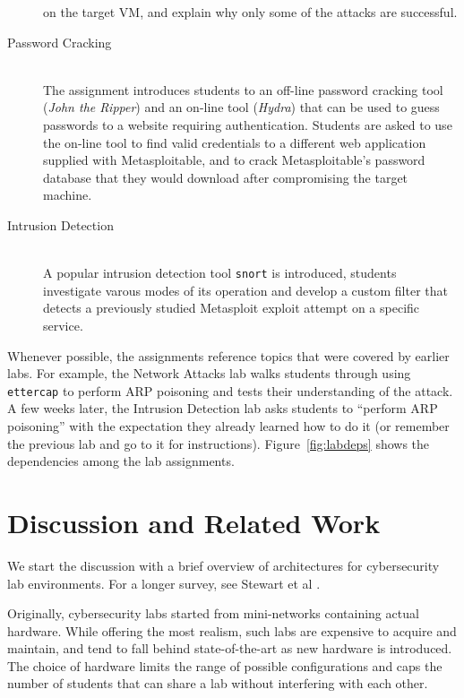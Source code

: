 \documentclass{sig-alternate-2013}
\begin{document}
\begin{description}
on the target VM, and explain why only some of the attacks are successful.
\item[Password Cracking] \hfill \\
The assignment introduces students to an off-line password cracking tool (\emph{John the Ripper}) and an on-line
tool (\emph{Hydra}) that can be used to guess passwords to a website requiring authentication. Students are asked to use the
on-line tool to find valid credentials to a different web application supplied with Metasploitable, and to crack 
Metasploitable's password database that they would download after compromising the target machine.
\item[Intrusion Detection] \hfill \\
A popular intrusion detection tool \texttt{snort} is introduced, students investigate varous modes of its operation
and develop a custom filter that detects a previously studied Metasploit exploit attempt on a specific service.
\end{description}

Whenever possible, the assignments reference topics that were covered by earlier labs. For example, the Network Attacks
lab walks students through using \texttt{ettercap} to perform ARP poisoning and tests their understanding of
the attack. A few weeks later, the Intrusion Detection lab asks students to ``perform ARP poisoning'' with the expectation
they already learned how to do it (or remember the previous lab and go to it for instructions). Figure~\ref{fig:labdeps} shows
the dependencies among the lab assignments.

\section{Discussion and Related Work}
We start the discussion with a brief overview of architectures for cybersecurity lab environments. 
For a longer survey, see Stewart et al \cite{virtplatform}.

Originally, cybersecurity labs started from mini-networks containing actual hardware. While offering
the most realism, such labs are expensive to acquire and maintain, and tend to fall behind state-of-the-art 
as new hardware is introduced. The choice of hardware limits the range of possible configurations and 
caps the number of students that can share a lab without interfering with each other.
\end{document}
